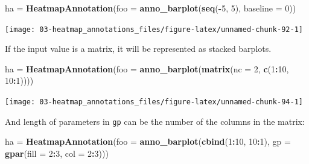 \documentclass[]{book}
\newenvironment{Shaded}{\begin{snugshade}}{\end{snugshade}}
\newcommand{\KeywordTok}[1]{\textcolor[rgb]{0.13,0.29,0.53}{\textbf{#1}}}
\newcommand{\DataTypeTok}[1]{\textcolor[rgb]{0.13,0.29,0.53}{#1}}
\newcommand{\DecValTok}[1]{\textcolor[rgb]{0.00,0.00,0.81}{#1}}
\newcommand{\StringTok}[1]{\textcolor[rgb]{0.31,0.60,0.02}{#1}}
\newcommand{\OperatorTok}[1]{\textcolor[rgb]{0.81,0.36,0.00}{\textbf{#1}}}
\newcommand{\NormalTok}[1]{#1}
\theoremstyle{definition}
\theoremstyle{definition}
\theoremstyle{definition}
\theoremstyle{remark}
\begin{document}
\begin{Shaded}
\begin{Highlighting}[]
\NormalTok{ha =}\StringTok{ }\KeywordTok{HeatmapAnnotation}\NormalTok{(}\DataTypeTok{foo =} \KeywordTok{anno_barplot}\NormalTok{(}\KeywordTok{seq}\NormalTok{(}\OperatorTok{-}\DecValTok{5}\NormalTok{, }\DecValTok{5}\NormalTok{), }\DataTypeTok{baseline =} \DecValTok{0}\NormalTok{))}
\end{Highlighting}
\end{Shaded}

\begin{center}\texttt{[image: 03-heatmap\_annotations\_files/figure-latex/unnamed-chunk-92-1]} \end{center}

If the input value is a matrix, it will be represented as stacked
barplots.

\begin{Shaded}
\begin{Highlighting}[]
\NormalTok{ha =}\StringTok{ }\KeywordTok{HeatmapAnnotation}\NormalTok{(}\DataTypeTok{foo =} \KeywordTok{anno_barplot}\NormalTok{(}\KeywordTok{matrix}\NormalTok{(}\DataTypeTok{nc =} \DecValTok{2}\NormalTok{, }\KeywordTok{c}\NormalTok{(}\DecValTok{1}\OperatorTok{:}\DecValTok{10}\NormalTok{, }\DecValTok{10}\OperatorTok{:}\DecValTok{1}\NormalTok{))))}
\end{Highlighting}
\end{Shaded}

\begin{center}\texttt{[image: 03-heatmap\_annotations\_files/figure-latex/unnamed-chunk-94-1]} \end{center}

And length of parameters in \texttt{gp} can be the number of the columns
in the matrix:

\begin{Shaded}
\begin{Highlighting}[]
\NormalTok{ha =}\StringTok{ }\KeywordTok{HeatmapAnnotation}\NormalTok{(}\DataTypeTok{foo =} \KeywordTok{anno_barplot}\NormalTok{(}\KeywordTok{cbind}\NormalTok{(}\DecValTok{1}\OperatorTok{:}\DecValTok{10}\NormalTok{, }\DecValTok{10}\OperatorTok{:}\DecValTok{1}\NormalTok{), }
    \DataTypeTok{gp =} \KeywordTok{gpar}\NormalTok{(}\DataTypeTok{fill =} \DecValTok{2}\OperatorTok{:}\DecValTok{3}\NormalTok{, }\DataTypeTok{col =} \DecValTok{2}\OperatorTok{:}\DecValTok{3}\NormalTok{)))}
\end{Highlighting}
\end{Shaded}
\end{document}
